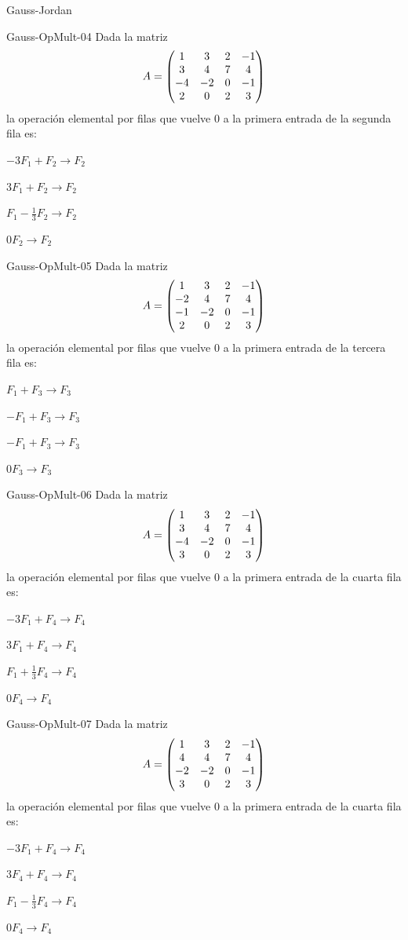 \documentclass[a4,11pt]{aleph-notas}
\begin{document}
\begin{quiz}{Gauss-Jordan}
\begin{multi}{Gauss-OpMult-04}
    Dada la matriz \[A= \begin{pmatrix} 1 & 3 & 2 & -1 \cr 3 & 4 & 7 & 4  \cr -4 & -2 & 0 & -1 \cr 2 & 0 & 2 & 3\end{pmatrix} \] la operación elemental por filas que vuelve $0$ a la primera entrada de la segunda fila es:
    \item* $-3F_1+F_2\to F_2$
    \item $3F_1+F_2\to F_2$
    \item $F_1-\frac{1}{3}F_2\to F_2$
    \item $0F_2\to F_2$
\end{multi}

\begin{multi}{Gauss-OpMult-05}
    Dada la matriz \[A= \begin{pmatrix} 1 & 3 & 2 & -1 \cr -2 & 4 & 7 & 4  \cr -1 & -2 & 0 & -1 \cr 2 & 0 & 2 & 3\end{pmatrix} \] la operación elemental por filas que vuelve $0$ a la primera entrada de la tercera fila es:
    \item* $F_1+F_3\to F_3$
    \item $-F_1+F_3\to F_3$
    \item $-F_1+F_3\to F_3$
    \item $0F_3\to F_3$
\end{multi}

\begin{multi}{Gauss-OpMult-06}
    Dada la matriz \[A= \begin{pmatrix} 1 & 3 & 2 & -1 \cr 3 & 4 & 7 & 4  \cr -4 & -2 & 0 & -1 \cr 3 & 0 & 2 & 3\end{pmatrix} \] la operación elemental por filas que vuelve $0$ a la primera entrada de la cuarta fila es:
    \item* $-3F_1+F_4\to F_4$
    \item $3F_1+F_4\to F_4$
    \item $F_1+\frac{1}{3}F_4\to F_4$
    \item $0F_4\to F_4$
\end{multi}
 
\begin{multi}{Gauss-OpMult-07}
    Dada la matriz
    \[
        A= \begin{pmatrix} 1 & 3 & 2 & -1 \cr 4 & 4 & 7 & 4  \cr -2 & -2 & 0 & -1 \cr 3 & 0 & 2 & 3\end{pmatrix} 
    \] la operación elemental por filas que vuelve $0$ a la primera entrada de la cuarta fila es:
    \item* $-3F_1+F_4\to F_4$
    \item $3F_4+F_4\to F_4$
    \item $F_1-\frac{1}{3}F_4\to F_4$
    \item $0F_4\to F_4$
\end{multi}


\end{quiz}
\end{document}
